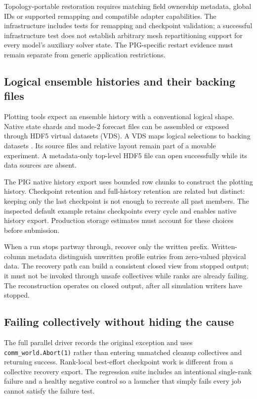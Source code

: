 \documentclass[11pt,a4paper]{article}
\newcommand{\code}[1]{\nolinkurl{#1}}
\begin{document}
Topology-portable restoration requires matching field ownership metadata, global IDs or supported remapping and compatible adapter capabilities. The infrastructure includes tests for remapping and checkpoint validation; a successful infrastructure test does not establish arbitrary mesh repartitioning support for every model's auxiliary solver state. The PIG-specific restart evidence must remain separate from generic application restrictions.

\subsection{Logical ensemble histories and their backing files}
Plotting tools expect an ensemble history with a conventional logical shape. Native state shards and mode-2 forecast files can be assembled or exposed through HDF5 virtual datasets (VDS). A VDS maps logical selections to backing datasets \citep{hdf5vds}. Its source files and relative layout remain part of a movable experiment. A metadata-only top-level HDF5 file can open successfully while its data sources are absent.

The PIG native history export uses bounded row chunks to construct the plotting history. Checkpoint retention and full-history retention are related but distinct: keeping only the last checkpoint is not enough to recreate all past members. The inspected default example retains checkpoints every cycle and enables native history export. Production storage estimates must account for these choices before submission.

When a run stops partway through, recover only the written prefix. Written-column metadata distinguish unwritten profile entries from zero-valued physical data. The recovery path can build a consistent closed view from stopped output; it must not be invoked through unsafe collectives while ranks are already failing. The reconstruction operates on closed output, after all simulation writers have stopped.

\subsection{Failing collectively without hiding the cause}
The full parallel driver records the original exception and uses \code{comm_world.Abort(1)} rather than entering unmatched cleanup collectives and returning success. Rank-local best-effort checkpoint work is different from a collective recovery export. The regression suite includes an intentional single-rank failure and a healthy negative control so a launcher that simply fails every job cannot satisfy the failure test.
\end{document}
